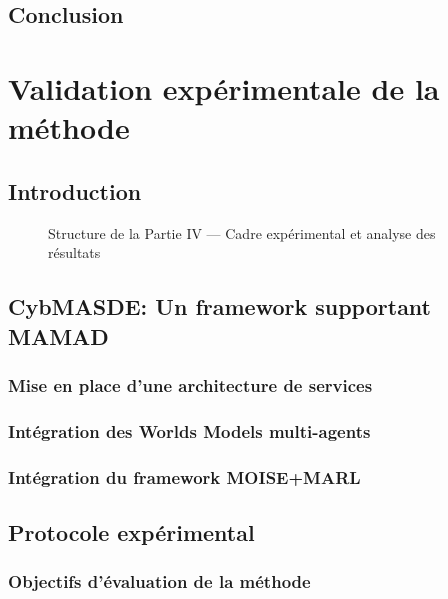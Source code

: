 \documentclass[ twoside,openright,titlepage,numbers=noenddot,headinclude,%
                footinclude=true,cleardoublepage=empty,abstractoff, %
                BCOR=5mm,paper=a4,fontsize=11pt,%
                french,american,%
                ]{scrreprt}
\begin{document}
\chapter*{Conclusion}

\cleardoublepage
{}
{}
\part{Validation expérimentale de la méthode}

\chapter*{Introduction}

\begin{figure}[h!]
    \centering
    
    \caption{Structure de la Partie IV — Cadre expérimental et analyse des résultats}
\end{figure}

\chapter{CybMASDE: Un framework supportant MAMAD}
\section{Mise en place d'une architecture de services}
\section{Intégration des Worlds Models multi-agents}
\section{Intégration du framework MOISE+MARL}

\chapter{Protocole expérimental}
\section{Objectifs d'évaluation de la méthode}
\end{document}

